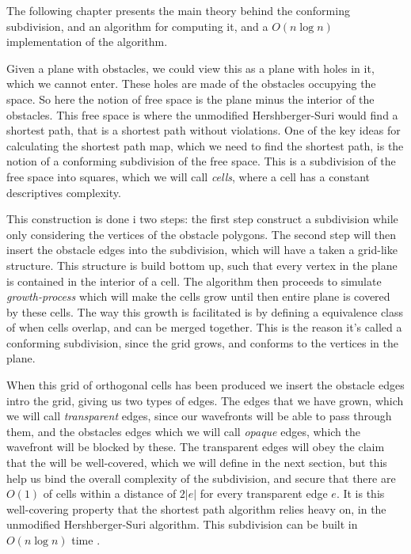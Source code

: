 The following chapter presents the main theory behind the conforming subdivision, and an 
algorithm for computing it, and a $O(n \log n)$ implementation of the algorithm. 

Given a plane with obstacles, we could view this as a plane with holes in it, which we 
cannot enter. These holes are made of the obstacles occupying the space. So here the notion 
of free space is the plane minus the interior of the obstacles. This free space is where the 
unmodified Hershberger-Suri would find a shortest path, that is a shortest path without 
violations. One of the key ideas for calculating the shortest path map, which we need to 
find the shortest path, is the notion of a conforming subdivision of the free space. This is 
a subdivision of the free space into squares, which we will call \textit{cells}, where a 
cell has a constant descriptives complexity. 

This construction is done i two steps: the 
first step construct a subdivision while only considering the vertices of the obstacle 
polygons. The second step will then insert the obstacle edges into the subdivision, which 
will have a taken a grid-like structure. This structure is build bottom up, such that every 
vertex in the plane is contained in the interior of a cell. The algorithm then proceeds to 
simulate \textit{growth-process} which will make the cells grow until then entire plane is 
covered by these cells. The way this growth is facilitated is by defining a equivalence 
class of when cells overlap, and can be merged together. This is the reason it's called a 
conforming subdivision, since the grid grows, and conforms to the vertices in the plane. 


When this grid of orthogonal cells has been produced we insert the obstacle edges intro the 
grid, giving us two types of edges. The edges that we have grown, which we will call 
\textit{transparent} edges, since our wavefronts will be able to pass through them, and the 
obstacles edges which we will call \textit{opaque} edges, which the wavefront will be 
blocked by these. The transparent edges will obey the claim that the will be well-covered, 
which we will define in the next section, but this help us bind the overall complexity of 
the subdivision, and secure that there are $O(1)$ of cells within a distance of $2|e|$ for 
every transparent edge $e$. It is this well-covering property that the shortest path 
algorithm relies heavy on, in the unmodified Hershberger-Suri algorithm. This subdivision 
can be built in $O(n \log n)$ time \cite{HershbergerS99}.


